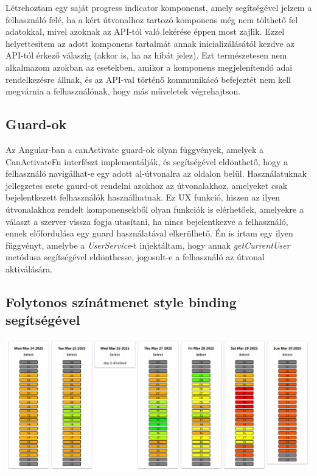 \documentclass[a4paper,12pt]{report}
\theoremstyle{definition}
\theoremstyle{remark}
\begin{document}
Létrehoztam egy saját progress indicator komponenst, amely segítségével jelzem a felhasználó felé, ha a kért útvonalhoz tartozó komponens még nem tölthető fel adatokkal, mivel azoknak az API-tól való lekérése éppen most zajlik. Ezzel helyettesítem az adott komponens tartalmát annak inicializálásától kezdve az API-tól érkező válaszig (akkor is, ha az hibát jelez). Ezt természetesen nem alkalmazom azokban az esetekben, amikor a komponens megjelenítendő adai rendelkezésre állnak, és az API-val történő kommunikácó befejeztét nem kell megvárnia a felhasználónak, hogy más műveletek végrehajtson.

	\subsection{Guard-ok}

Az Angular-ban a canActivate guard-ok olyan függvények, amelyek a CanActivateFn\cite{Guardwebsite} interfészt implementálják, és segítségével eldönthető, hogy a felhasználó navigálhat-e egy adott al-útvonalra az oldalon belül. Használatuknak jellegzetes esete gaurd-ot rendelni azokhoz az útvonalakhoz, amelyeket csak bejelentkezett felhasználók használhatnak. Ez UX funkció, hiszen az ilyen útvonalakhoz rendelt komponensekből olyan funkciók is elérhetőek, amelyekre a választ a szerver vissza fogja utasítani, ha nincs bejelentkezve a felhasználó, ennek előfordulása egy guard használatával elkerülhető. Én is írtam egy ilyen függvényt, amelybe a  \textit{UserService}-t injektáltam, hogy annak  \textit{getCurrentUser} metódusa segítségével eldönthesse, jogosult-e a felhasználó az útvonal aktiválására.

	\subsection{Folytonos színátmenet style binding segítségével}

\begin{center}
\includegraphics[width=160mm]{week_view}
\captionsetup{width=0.8\linewidth}
\label{week_view}
\end{center}
\end{document}
